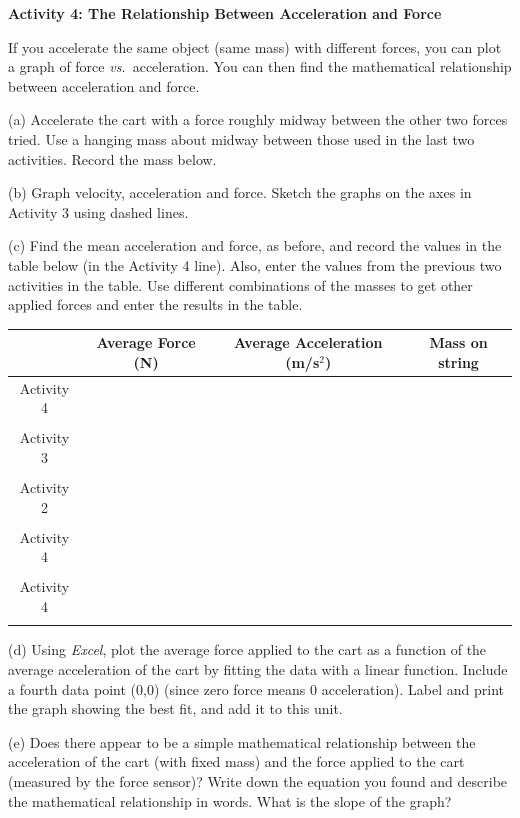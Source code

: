 \pagebreak[2]
\textbf{Activity 4: The Relationship Between Acceleration and Force }

If you accelerate the same object (same mass) with different forces, you can 
plot a graph of force \textit{vs.}~acceleration. You can then find the mathematical relationship between acceleration and force. 

(a) Accelerate the cart with a force roughly midway between the other two forces
tried. Use a hanging mass about midway between those used in the last two activities.
Record the mass below.
\answerspace{10mm}

(b) Graph velocity, acceleration and force. Sketch the graphs on the axes in
Activity 3 using dashed lines.

(c) Find the mean acceleration and force, as before, and record the values in
the table below (in the Activity 4 line). Also, enter the values from the previous 
two activities in the table. Use different combinations of the
masses to get other applied forces and enter the results in the table. 

\vspace{0.3cm}
{\centering \begin{tabular}{|c|c|c|c|}
\hline 
&
Average Force (N)&
Average Acceleration (m/s\( ^{2} \)) &
Mass on string\\
\hline 
Activity 4&
&
&
\\
&
&
&
\\
\hline 
Activity 3&
&
&
\\
&
&
&
\\
\hline 
Activity 2&
&
&
\\
&
&
&
\\
\hline 
Activity 4&
&
&
\\
&
&
&
\\
\hline 
Activity 4&
&
&
\\
&
&
&
\\
\hline 
\end{tabular}\par}
\vspace{0.3cm}

(d) Using \textit{Excel}, plot the average force applied to the cart as a function of the average acceleration of the cart by fitting the data with a linear function. Include a fourth data point (0,0) (since zero force means 0 acceleration). Label and print the graph showing the best fit, and add it to this unit.

(e) Does there appear to be a simple mathematical relationship between the acceleration of the cart (with fixed mass) and the force applied to the cart (measured by the force sensor)? Write down the equation you found and describe the mathematical relationship in words.  What is the slope of the graph?
\answerspace{20mm}

